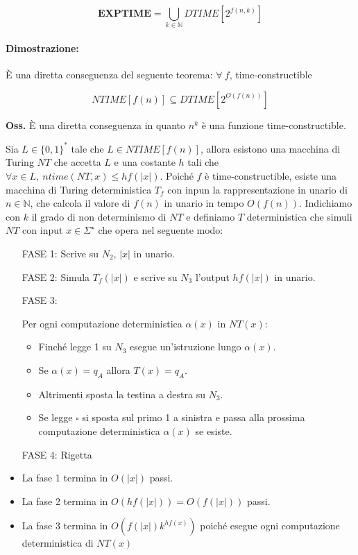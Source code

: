\[
    \textbf{EXPTIME} = \bigcup_{k\in \mathbb{N}} DTIME[2^{f(n, k)}]
\]

\paragraph*{Dimostrazione:} È una diretta conseguenza del seguente teorema: $\forall\ f$, time-constructible

$$NTIME[f(n)] \subseteq DTIME[2^{O(f(n))}]$$

\textbf{Oss.} È una diretta conseguenza in quanto $n^k$ è una funzione time-constructible.

Sia $L \in \{0, 1\}^*$ tale che $L \in NTIME[f(n)]$, allora esistono una macchina di Turing $NT$ che accetta $L$ e una 
costante $h$ tali che $\forall x \in L,\ ntime(NT, x) \leq hf(|x|)$. Poiché $f$ è time-constructible, esiste una macchina 
di Turing deterministica $T_{f}$ con inpun la rappresentazione in unario di $n \in \mathbb{N}$, che calcola il valore di 
$f(n)$ in unario in tempo $O(f(n))$. Indichiamo con $k$ il grado di non determinismo di $NT$ e definiamo $T$ deterministica
che simuli $NT$ con input $x \in \Sigma^{\star}$ che opera nel seguente modo:

\begin{itemize}
    \item [FASE 1:] Scrive su $N_{2}$, $|x|$ in unario.
    \item [FASE 2:] {
        Simula $T_{f}(|x|)$ e scrive su $N_{3}$ l'output $hf(|x|)$ in unario.
    }
    \item [FASE 3:] {
        Per ogni computazione deterministica $\alpha(x)$ in $NT(x)$:
        \begin{itemize}
            \item Finché legge 1 su $N_{3}$ esegue un'istruzione lungo $\alpha(x)$.
            \item Se $\alpha(x) = q_{A}$ allora $T(x) = q_{A}$.
            \item Altrimenti sposta la testina a destra su $N_{3}$.
            \item Se legge $\square$ si sposta sul primo 1 a sinistra e passa alla prossima computazione deterministica $\alpha(x)$ se esiste.
        \end{itemize}
    }
    \item [FASE 4:] Rigetta
\end{itemize}

\begin{itemize}
    \item La fase 1 termina in $O(|x|)$ passi.
    \item La fase 2 termina in $O(hf(|x|)) = O(f(|x|))$ passi.
    \item La fase 3 termina in $O(f(|x|)k^{hf(x)})$ poiché esegue ogni computazione deterministica di $NT(x)$
\end{itemize}

